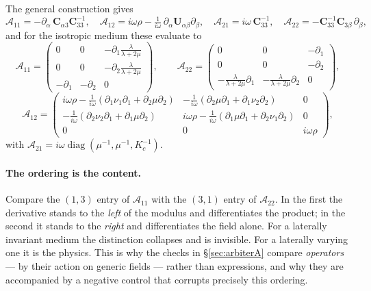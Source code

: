\documentclass[11pt,a4paper]{article}
\newcommand{\bC}{\mathbf{C}}
\newcommand{\bU}{\mathbf{U}}
\newcommand{\Aop}{\mathcal{A}}
\begin{document}
The general construction gives
\begin{equation}\label{eq:Ablocks}
  \Aop_{11} = -\partial_\alpha\,\bC_{\alpha3}\bC_{33}^{-1},
  \quad
  \Aop_{12} = i\omega\rho - \tfrac{1}{i\omega}\,\partial_\alpha\bU_{\alpha\beta}\partial_\beta,
  \quad
  \Aop_{21} = i\omega\,\bC_{33}^{-1},
  \quad
  \Aop_{22} = -\bC_{33}^{-1}\bC_{3\beta}\,\partial_\beta,
\end{equation}
and for the isotropic medium these evaluate to
\begin{equation}\label{eq:A11A22}
  \Aop_{11} =
  \begin{pmatrix}
    0 & 0 & -\partial_1\tfrac{\lambda}{\lambda+2\mu}\\
    0 & 0 & -\partial_2\tfrac{\lambda}{\lambda+2\mu}\\
    -\partial_1 & -\partial_2 & 0
  \end{pmatrix},
  \qquad
  \Aop_{22} =
  \begin{pmatrix}
    0 & 0 & -\partial_1\\
    0 & 0 & -\partial_2\\
    -\tfrac{\lambda}{\lambda+2\mu}\partial_1 & -\tfrac{\lambda}{\lambda+2\mu}\partial_2 & 0
  \end{pmatrix},
\end{equation}
\begin{equation}\label{eq:A12A21}
  \Aop_{12} =
  \begin{pmatrix}
    i\omega\rho - \tfrac{1}{i\omega}(\partial_1\nu_1\partial_1 + \partial_2\mu\partial_2)
      & -\tfrac{1}{i\omega}(\partial_2\mu\partial_1 + \partial_1\nu_2\partial_2) & 0\\
    -\tfrac{1}{i\omega}(\partial_2\nu_2\partial_1 + \partial_1\mu\partial_2)
      & i\omega\rho - \tfrac{1}{i\omega}(\partial_1\mu\partial_1 + \partial_2\nu_1\partial_2) & 0\\
    0 & 0 & i\omega\rho
  \end{pmatrix},
\end{equation}
with $\Aop_{21} = i\omega\operatorname{diag}(\mu^{-1},\mu^{-1},K_c^{-1})$.

\paragraph{The ordering is the content.}  Compare the $(1,3)$ entry of
$\Aop_{11}$ with the $(3,1)$ entry of $\Aop_{22}$.  In the first the derivative
stands to the \emph{left} of the modulus and differentiates the product; in the
second it stands to the \emph{right} and differentiates the field alone.  For a
laterally invariant medium the distinction collapses and is invisible.  For a
laterally varying one it is the physics.  This is why the checks in
\S\ref{sec:arbiterA} compare \emph{operators} --- by their action on generic
fields --- rather than expressions, and why they are accompanied by a negative
control that corrupts precisely this ordering.
\end{document}
